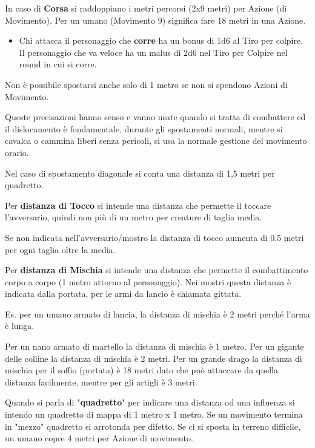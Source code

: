 \documentclass[a4paper,11pt,twoside,openany]{book}
\begin{document}
In caso di \textbf{Corsa} si raddoppiano i metri percorsi (2x9 metri) per Azione (di Movimento). Per un umano (Movimento 9) significa fare 18 metri in una Azione.

\begin{itemize}
	\item Chi attacca il personaggio che \textbf{corre} ha un bonus di 1d6 al Tiro per colpire. Il personaggio che va veloce ha un malus di 2d6 nel Tiro per Colpire nel round in cui si corre.
\end{itemize}

Non è possibile spostarsi anche solo di 1 metro se non si spendono Azioni di Movimento.

Queste precisazioni hanno senso e vanno usate quando si tratta di combattere ed il dislocamento è fondamentale, durante gli spostamenti normali, mentre si cavalca o cammina liberi senza pericoli, si usa la normale gestione del movimento orario.

Nel caso di spostamento diagonale si conta una distanza di 1,5 metri per quadretto.

Per \textbf{distanza di Tocco}  si intende una distanza che permette il toccare l'avversario, quindi non più di un metro per creature di taglia media.

Se non indicata nell'avversario/mostro la distanza di tocco aumenta di 0.5 metri per ogni taglia oltre la media.

Per \textbf{distanza di Mischia}  si intende una distanza che permette il combattimento corpo a corpo (1 metro attorno al personaggio). Nei mostri questa distanza è indicata dalla portata, per le armi da lancio è chiamata gittata.

Es. per un umano armato di lancia, la distanza di mischia è 2 metri perché l'arma è lunga.

Per un nano armato di martello la distanza di mischia è 1 metro. Per un gigante delle colline la distanza di mischia è 2 metri. Per un grande drago la distanza di mischia per il soffio (portata) è 18 metri dato che può attaccare da quella distanza facilmente, mentre per gli artigli è 3 metri.

Quando si parla di "\textbf{quadretto}" per indicare una distanza od una influenza si intendo un quadretto di mappa di 1 metro x 1 metro.
Se un movimento termina in "mezzo" quadretto si arrotonda per difetto.
Se ci si sposta in terreno difficile, un umano copre 4 metri per Azione di movimento.
\end{document}
